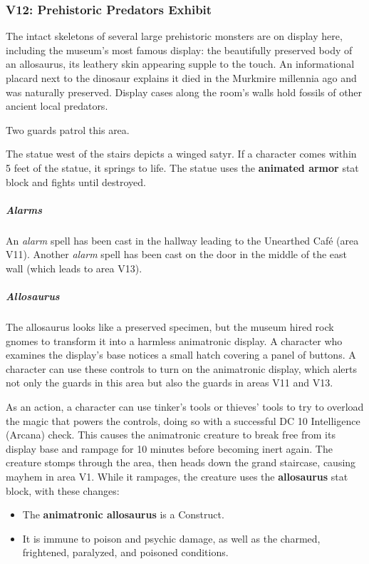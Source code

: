 \documentclass[10pt,a4paper,twoside,bg=print,twocolumn,openany,nodeprecatedcode]{dndbook}
\begin{document}
\subsubsection{V12: Prehistoric Predators Exhibit}
\begin{DndReadAloud}{}
The intact skeletons of several large prehistoric monsters are on display here, including the museum's most famous display: the beautifully preserved body of an allosaurus, its leathery skin appearing supple to the touch. An informational placard next to the dinosaur explains it died in the Murkmire millennia ago and was naturally preserved. Display cases along the room's walls hold fossils of other ancient local predators.

\end{DndReadAloud}

Two guards patrol this area.

The statue west of the stairs depicts a winged satyr. If a character comes within 5 feet of the statue, it springs to life. The statue uses the \textbf{animated armor} stat block and fights until destroyed.

\subparagraph{Alarms}
An \textit{alarm} spell has been cast in the hallway leading to the Unearthed Café (area V11). Another \textit{alarm} spell has been cast on the door in the middle of the east wall (which leads to area V13).

\subparagraph{Allosaurus}
The allosaurus looks like a preserved specimen, but the museum hired rock gnomes to transform it into a harmless animatronic display. A character who examines the display's base notices a small hatch covering a panel of buttons. A character can use these controls to turn on the animatronic display, which alerts not only the guards in this area but also the guards in areas V11 and V13.

As an action, a character can use tinker's tools or thieves' tools to try to overload the magic that powers the controls, doing so with a successful DC 10 Intelligence (Arcana) check. This causes the animatronic creature to break free from its display base and rampage for 10 minutes before becoming inert again. The creature stomps through the area, then heads down the grand staircase, causing mayhem in area V1. While it rampages, the creature uses the \textbf{allosaurus} stat block, with these changes:


\begin{itemize}
\item The \textbf{animatronic allosaurus} is a Construct.
\item It is immune to poison and psychic damage, as well as the charmed, frightened, paralyzed, and poisoned conditions.
\end{itemize}
\end{document}
